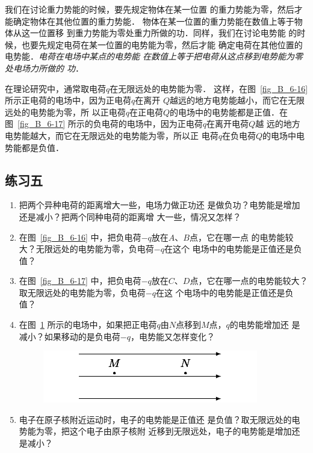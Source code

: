 我们在讨论重力势能的时候，要先规定物体在某一位置
的重力势能为零，然后才能确定物体在其他位置的重力势能．
物体在某一位置的重力势能在数值上等于物体从这一位置移
到重力势能为零处重力所做的功．同样，我们在讨论电势能
的时候，也要先规定电荷在某一位置的电势能为零，然后才能
确定电荷在其他位置的电势能．\textit{电荷在电场中某点的电势能
在数值上等于把电荷从这点移到电势能为零处电场力所做的
功}．

在理论研究中，通常取电荷$q$在无限远处的电势能为零．
这样，在图~\ref{fig_B_6-16} 所示正电荷的电场中，因为正电荷$q$在离开
$Q$越远的地方电势能越小，而它在无限远处的电势能为零，所
以正电荷$q$在正电荷$Q$的电场中的电势能都是正值．在图~\ref{fig_B_6-17} 
所示的负电荷的电场中，因为正电荷$q$在离开电荷$Q$越
远的地方电势能越大，而它在无限远处的电势能为零，所以正
电荷$q$在负电荷$Q$的电场中电势能都是负值．


\subsection*{练习五}

\begin{enumerate}
    \item 把两个异种电荷的距离增大一些，电场力做正功还
是做负功？电势能是增加还是减小？把两个同种电荷的距离增
大一些，情况又怎样？
\item 在图~\ref{fig_B_6-16} 中，把负电荷$-q$放在$A$、$B$点，它在哪一点
的电势能较大？无限远处的电势能为零，负电荷$-q$在这个
电场中的电势能是正值还是负值？
\item 在图~\ref{fig_B_6-17} 中，把负电荷$-q$放在$C$、$D$点，它在哪一点的电势能较大？取无限远处的电势能为零，负电荷$-q$在这
个电场中的电势能是正值还是负值？
\item 在图~\ref{fig_B_6-18} 所示的电场中，如果把正电荷$q$由$N$点移到$M$点，$q$的电势能增加还
是减小？如果移动的是负电荷$-q$，电势能又怎样变化？
\begin{figure}[htbp]
    \centering
    \includegraphics{fig/B/6-18.pdf}
    \caption{}\label{fig_B_6-18}
\end{figure}    

\item  电子在原子核附近运动时，电子的电势能是正值还
是负值？取无限远处的电势能为零，把这个电子由原子核附
近移到无限远处，电子的电势能是增加还是减小？
\end{enumerate}


